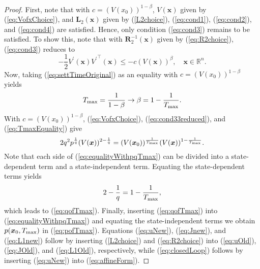 \documentclass[lettersize,journal]{IEEEtran}
\begin{document}
\begin{proof}
First, note that with $c = (V(x_0))^{1-\beta}$, $V(\bm{x})$ given by (\ref{eq:VofxChoice}), and $\bm{L}_2(\bm{x})$ given by (\ref{L2choice}), (\ref{eq:cond1}), (\ref{eq:cond2}), and (\ref{eq:cond4}) are satisfied.    Hence, only condition (\ref{eq:cond3}) remains to be satisfied. To show this, note that with $\bm{R}^{-1}_2(\bm{x})$ given by (\ref{eq:R2choice}),  (\ref{eq:cond3}) reduces to  
\begin{equation}\label{eq:cond33reduced}
-\frac{1}{2}V^\prime(\bm{x}){V^\prime}^\top(\bm{x}) \leq - c(V(\bm{x}))^\beta, \quad \bm{x} \in \mathbb{R}^{n}.
\end{equation}
Now, taking (\ref{eq:settTimeOriginal}) as an equality with $c = (V(x_0))^{1-\beta}$ yields
\begin{equation}\label{eq:TmaxEquality}
T_{\textup{max}} = \frac{1}{1-\beta} \rightarrow \beta = 1 - \frac{1}{T_{\textup{max}}}. 
\end{equation}
With $c = (V(x_0))^{1-\beta}$, (\ref{eq:VofxChoice}), (\ref{eq:cond33reduced}), and (\ref{eq:TmaxEquality}) give
\begin{equation}\label{eq:equalityWithpqTmax}
2q^2p^{\frac{1}{q}}(V(\bm{x}))^{2 - \frac{1}{q}} = (V(\bm{x}_0))^{\frac{1}{T_{\textup{max}}}} (V(\bm{x}))^{1-\frac{1}{T_{\textup{max}}}}.
\end{equation}
Note that each side of (\ref{eq:equalityWithpqTmax}) can be divided into a state-dependent term and a state-independent term. Equating the state-dependent terms yields
\begin{equation}
2 - \frac{1}{q} = 1 - \frac{1}{T_{\textup{max}}},
\end{equation}
which leads to (\ref{eq:qofTmax}). Finally, inserting (\ref{eq:qofTmax}) into (\ref{eq:equalityWithpqTmax}) and equating the state-independent terms we obtain $p(\bm{x}_0, T_{\textup{max}})$ in (\ref{eq:pofTmax}). Equations (\ref{eq:uNew}), (\ref{eq:Jnew}), and (\ref{eq:L1new}) follow by inserting (\ref{L2choice}) and (\ref{eq:R2choice}) into (\ref{eq:uOld}), (\ref{eq:JOld}), and (\ref{eq:L1Old}), respectively, while (\ref{eq:closedLoop}) follows by inserting (\ref{eq:uNew}) into (\ref{eq:affineForm}).
\end{proof}
\end{document}
